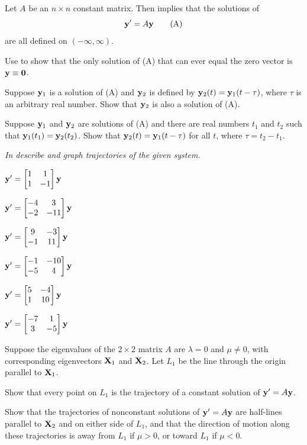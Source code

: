 \begin{exerciselist}
\item\label{exer:10.4.28}Let $A$ be an $n\times n$ constant matrix. Then
 implies that the solutions
of
\[
\mathbf{y}'=A\mathbf{y}
\tag{A}
\]
are all defined on $(-\infty,\infty)$.
\begin{alist}
\item %
Use  to show that the only
solution
of (A) that can ever equal the zero vector is $\mathbf{y}\equiv\mathbf{0}$.
\item %
Suppose $\mathbf{y}_1$ is a solution of (A) and $\mathbf{y}_2$ is
defined by $\mathbf{y}_2(t)=\mathbf{y}_1(t-\tau)$, where $\tau$ is an
arbitrary real number. Show that $\mathbf{y}_2$ is also a solution of
(A).
\item %
Suppose $\mathbf{y}_1$ and $\mathbf{y}_2$ are solutions of (A) and
there are real numbers $t_1$ and $t_2$ such that $\mathbf{y}_1(t_1)=\mathbf{y}_2(t_2)$. Show that $\mathbf{y}_2(t)=\mathbf{y}_1(t-\tau)$ for all $t$,
where $\tau=t_2-t_1$. 
\end{alist}
\end{exerciselist}
%
\textsl{In 
describe and graph trajectories of the given system.}
\begin{exerciselistTwoColumn}
\item\label{exer:10.4.29}\CGex $\mathbf{y}'=\begin{bmatrix}1&1\\1&-1\end{bmatrix}\mathbf{y}$
\item\label{exer:10.4.30}\CGex $\mathbf{y}'=\begin{bmatrix}-4&3\\-2&-11\end{bmatrix}\mathbf{y}$
\item\label{exer:10.4.31}\CGex $\mathbf{y}'=\begin{bmatrix}9&-3\\-1&11\end{bmatrix}\mathbf{y}$
\item\label{exer:10.4.32}\CGex $\mathbf{y}'=\begin{bmatrix}-1&-10\\-5&4\end{bmatrix}\mathbf{y}$
\item\label{exer:10.4.33}\CGex $\mathbf{y}'=\begin{bmatrix}5&-4\\1&10\end{bmatrix}\mathbf{y}$
\item\label{exer:10.4.34}\CGex $\mathbf{y}'=\begin{bmatrix}-7&1\\3&-5\end{bmatrix}\mathbf{y}$
\end{exerciselistTwoColumn}
\begin{exerciselist}
\item\label{exer:10.4.35}Suppose the eigenvalues of the $2\times 2$
matrix $A$ are $\lambda=0$ and $\mu\ne0$, with
corresponding  eigenvectors $\mathbf{X}_1$ and $\mathbf{X}_2$.
Let $L_1$ be the line through the origin parallel to $\mathbf{X}_1$.
\begin{alist}
\item %
Show that every point on $L_1$ is the trajectory of a constant
solution of $\mathbf{y}'=A\mathbf{y}$.
\item %
Show that the trajectories of nonconstant solutions of $\mathbf{y}'=A\mathbf{y}$ are half-lines parallel to $\mathbf{X}_2$ and on either side of
$L_1$, and that the direction of motion along these trajectories is
away from $L_1$ if $\mu>0$, or toward $L_1$ if $\mu<0$.
\end{alist}
\end{exerciselist}

